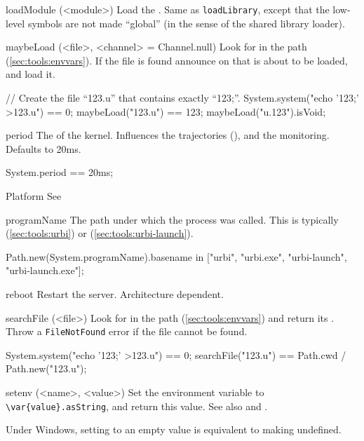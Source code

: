 \begin{urbiscriptapi}
\item[loadModule](<module>)%
  Load the \UObject {}.  Same as \lstinline|loadLibrary|,
  except that the low-level \Cxx symbols are not made ``global'' (in
  the sense of the shared library loader).

\item[maybeLoad](<file>, <channel> = Channel.null)%
  Look for  in the \urbi path (\autoref{sec:tools:envvars}).
  If the file is found announce on  that  is
  about to be loaded, and load it.

\begin{urbiassert}
// Create the file ``123.u'' that contains exactly ``123;''.
System.system("echo '123;' >123.u") == 0;
maybeLoad("123.u") == 123;
maybeLoad("u.123").isVoid;
\end{urbiassert}

\item[period] The  of the \urbi kernel.  Influences the
  trajectories (), and the \UObject
  monitoring.  Defaults to 20ms.
\begin{urbiassert}
System.period == 20ms;
\end{urbiassert}

\item[Platform] See 

\item[programName] The path under which the \urbi process was called.
  This is typically  (\autoref{sec:tools:urbi}) or
   (\autoref{sec:tools:urbi-launch}).
\begin{urbiassert}
Path.new(System.programName).basename
  in ["urbi", "urbi.exe", "urbi-launch", "urbi-launch.exe"];
\end{urbiassert}

\item[reboot] Restart the \urbi server.  Architecture dependent.

\item[searchFile](<file>)%
  Look for  in the \urbi path (\autoref{sec:tools:envvars})
  and return its .  Throw a \lstinline|FileNotFound|
  error if the file cannot be found.
\begin{urbiassert}
System.system("echo '123;' >123.u") == 0;
searchFile("123.u") == Path.cwd / Path.new("123.u");
\end{urbiassert}

\item[setenv](<name>, <value>)%
  Set the environment variable  to
  \lstinline|\var{value}.asString|, and return this value.  See also
   and .
  \begin{windows}
    Under Windows, setting to an empty value is equivalent to
    making undefined.
  \end{windows}


\end{urbiscriptapi}
